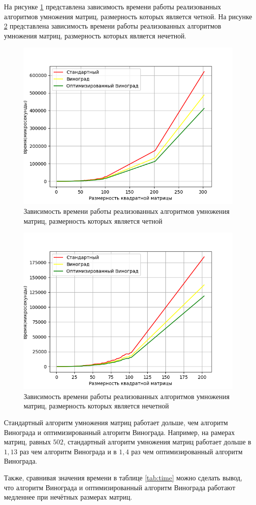 На рисунке \ref{img:result} представлена зависимость времени работы реализованных алгоритмов умножения матриц, размерность которых является четной. На рисунке \ref{img:resultOdd} представлена зависимость времени работы реализованных алгоритмов умножения матриц, размерность которых является нечетной. 
\begin{figure}[h]
	\centering
	\includegraphics[width=140mm]{images/result}
	\caption{Зависимость времени работы реализованных алгоритмов умножения матриц, размерность которых является четной}
	\label{img:result}
\end{figure}
\begin{figure}[h]
	\centering
	\includegraphics[width=140mm]{images/resultOdd}
	\caption{Зависимость времени работы реализованных алгоритмов умножения матриц, размерность которых является нечетной}
	\label{img:resultOdd}
\end{figure}

\clearpage
Стандартный алгоритм умножения матриц работает дольше, чем алгоритм Винограда и оптимизированный алгоритм Винограда. Например, на рамерах матриц, равных $502$, стандартный алгоритм умножения матриц работает дольше в $1,13$ раз чем алгоритм Винограда и в $1,4$ раз чем оптимизированный алгоритм Винограда.

Также, сравнивая значения времени в таблице \ref{tab:time} можно сделать вывод, что алгоритм Винограда и оптимизированный алгоритм Винограда работают медленнее при нечётных размерах матриц.
